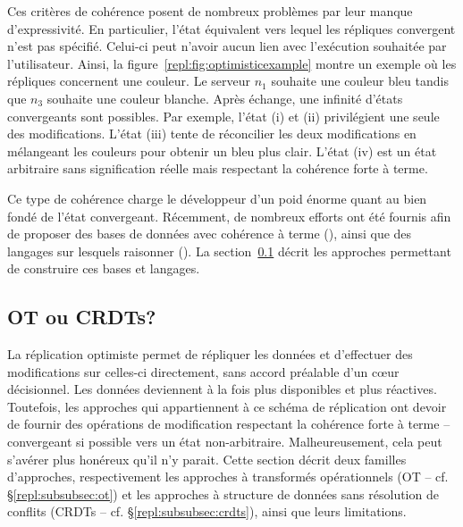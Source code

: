 \begin{figure*}
  \centering
  \hspace{10pt}
  \caption{\label{repl:fig:optimisticexample} Exemple de réplication optimiste
    avec modifications concurrentes.}
\end{figure*}


Ces critères de cohérence posent de nombreux problèmes par leur manque
d'expressivité. En particulier, l'état équivalent vers lequel les répliques
convergent n'est pas spécifié. Celui-ci peut n'avoir aucun lien avec l'exécution
souhaitée par l'utilisateur. Ainsi, la figure~\ref{repl:fig:optimisticexample}
montre un exemple où les répliques concernent une couleur. Le serveur $n_1$
souhaite une couleur bleu tandis que $n_3$ souhaite une couleur blanche. Après
échange, une infinité d'états convergeants sont possibles. Par exemple, l'état
(i) et (ii) privilégient une seule des modifications. L'état (iii) tente de
réconcilier les deux modifications en mélangeant les couleurs pour obtenir un
bleu plus clair. L'état (iv) est un état arbitraire sans signification réelle
mais respectant la cohérence forte à terme.

Ce type de cohérence charge le développeur d'un poid énorme quant au bien fondé
de l'état convergeant.  Récemment, de nombreux efforts ont été fournis afin de
proposer des bases de données avec cohérence à terme (\REF), ainsi que des
langages sur lesquels raisonner (\REF). La section~\ref{repl:subsec:otorcrdts}
décrit les approches permettant de construire ces bases et langages.


\subsection{OT ou CRDTs?}
\label{repl:subsec:otorcrdts}

La réplication optimiste permet de répliquer les données et d'effectuer des
modifications sur celles-ci directement, sans accord préalable d'un cœur
décisionnel. Les données deviennent à la fois plus disponibles et plus
réactives. Toutefois, les approches qui appartiennent à ce schéma de réplication
ont devoir de fournir des opérations de modification respectant la cohérence
forte à terme -- convergeant si possible vers un état
non-arbitraire. Malheureusement, cela peut s'avérer plus honéreux qu'il n'y
parait. Cette section décrit deux familles d'approches, respectivement les
approches à transformés opérationnels (OT -- cf. §\ref{repl:subsubsec:ot}) et
les approches à structure de données sans résolution de conflits (CRDTs --
cf. §\ref{repl:subsubsec:crdts}), ainsi que leurs limitations.

